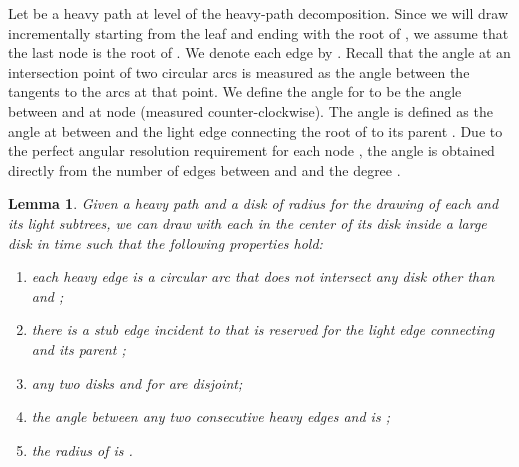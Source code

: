 \documentclass[11pt]{article}
\newtheorem{lemma}{Lemma}
\begin{document}
Let  be a heavy path at level  of the
heavy-path decomposition. Since we will draw  incrementally starting from the leaf and ending with the root of , we assume that the last node  is the root of . We denote each edge  by .  
Recall that the angle at an intersection point of two circular arcs is
measured as the angle between the tangents to the arcs at that
point. We define the angle  for  to be
the angle between  and  at node  (measured
counter-clockwise).  The angle  is defined as the angle
at  between  and the light edge  connecting
the root  of  to its parent . 
Due to the perfect angular resolution requirement for each node ,
the angle  is obtained directly from the number of edges
between  and  and the degree .

\begin{lemma}\label{lem:heavypath:lombardi}
  Given a heavy path  and a disk  of radius
   for the drawing of each  and its light subtrees, we can
  draw  with each  in the center of its disk  inside a
  large disk  in  time 
such that the following properties hold:
  \begin{enumerate}
  \item\label{item:lom:edges} each heavy edge  is a
    circular arc that does not intersect any disk other than
     and ;
  \item\label{item:lom:light} there is a stub edge incident to 
    that is reserved for the light edge connecting  and its
    parent ;
  \item\label{item:lom:disjoint} any two disks  and  for
     are disjoint;
  \item\label{item:lom:angres} the angle between any two consecutive
    heavy edges  and  is ;
  \item\label{item:lom:area} the radius of  is .
  \end{enumerate}
\end{lemma}
\end{document}
